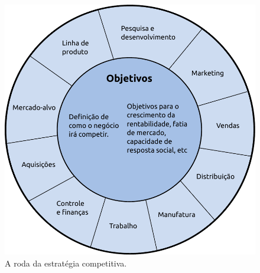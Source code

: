 \begin{figure}[!h]
	\begin{center}
		\includegraphics[scale=0.65]{../slides/imagens/estrategia.pdf}
	\end{center}
	\caption{\label{estrategia} A roda da estratégia competitiva.}
\end{figure}


